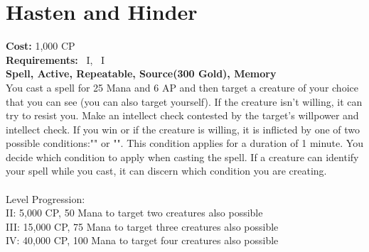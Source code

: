 \section{Hasten and Hinder}\label{spell:hastenHinder}
\textbf{Cost:} 1,000 CP\\
\textbf{Requirements:}~ I,~ I\\
\textbf{Spell, Active, Repeatable, Source(300 Gold), Memory}\\
You cast a spell for 25 Mana and 6 AP and then target a creature of your choice that you can see (you can also target yourself).
If the creature isn't willing, it can try to resist you.
Make an intellect check contested by the target's willpower and intellect check.
If you win or if the creature is willing, it is inflicted by one of two possible conditions:"" or "".
This condition applies for a duration of 1 minute.
You decide which condition to apply when casting the spell.
If a creature can identify your spell while you cast, it can discern which condition you are creating.\\
\\
Level Progression:\\
II: 5,000 CP, 50 Mana to target two creatures also possible\\
III: 15,000 CP, 75 Mana to target three creatures also possible\\
IV: 40,000 CP, 100 Mana to target four creatures also possible \\